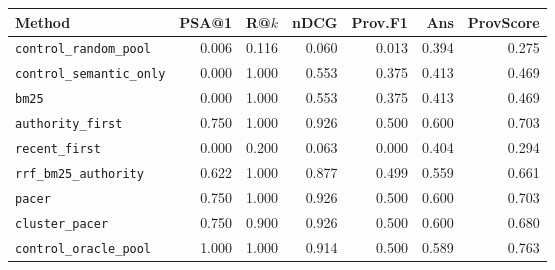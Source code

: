 \begin{tabular}{lrrrrrr}
\hline
Method & PSA@1 & R@$k$ & nDCG & Prov.F1 & Ans & ProvScore \\
\hline
\texttt{control\_random\_pool} & 0.006 & 0.116 & 0.060 & 0.013 & 0.394 & 0.275 \\
\texttt{control\_semantic\_only} & 0.000 & 1.000 & 0.553 & 0.375 & 0.413 & 0.469 \\
\texttt{bm25} & 0.000 & 1.000 & 0.553 & 0.375 & 0.413 & 0.469 \\
\texttt{authority\_first} & 0.750 & 1.000 & 0.926 & 0.500 & 0.600 & 0.703 \\
\texttt{recent\_first} & 0.000 & 0.200 & 0.063 & 0.000 & 0.404 & 0.294 \\
\texttt{rrf\_bm25\_authority} & 0.622 & 1.000 & 0.877 & 0.499 & 0.559 & 0.661 \\
\texttt{pacer} & 0.750 & 1.000 & 0.926 & 0.500 & 0.600 & 0.703 \\
\texttt{cluster\_pacer} & 0.750 & 0.900 & 0.926 & 0.500 & 0.600 & 0.680 \\
\texttt{control\_oracle\_pool} & 1.000 & 1.000 & 0.914 & 0.500 & 0.589 & 0.763 \\
\hline
\end{tabular}

